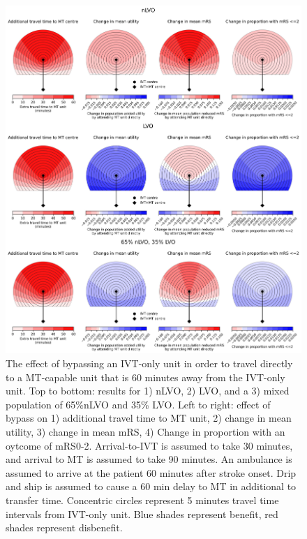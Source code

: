 \begin{figure}
\centering
\includegraphics[width=\textwidth]{./images/circles_stroke_types}
\caption{The effect of bypassing an IVT-only unit in order to travel directly to a MT-capable unit that is 60 minutes away from the IVT-only unit. Top to bottom: results for 1) nLVO, 2) LVO, and a 3) mixed population of 65\%nLVO and 35\% LVO. Left to right: effect of bypass on 1) additional travel time to MT unit, 2) change in mean utility, 3) change in mean mRS, 4) Change in proportion with an oytcome of mRS0-2. Arrival-to-IVT is assumed to take 30 minutes, and arrival to MT is assumed to take 90 minutes. An ambulance is assumed to arrive at the patient 60 minutes after stroke onset. Drip and ship is assumed to cause a 60 min delay to MT in additional to transfer time. Concentric circles represent 5 minutes travel time intervals from IVT-only unit. Blue shades represent benefit, red shades represent disbenefit.}
\label{fig:circles}
\end{figure}

